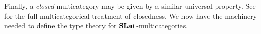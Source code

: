 Finally, a \emph{closed} multicategory may be given by a similar universal property.
See~\cite{shulman2016categorical} for the full multicategorical treatment of
closedness.
We now have the machinery needed to define the type theory for
$\mathbf{SLat}$-multicategories.
